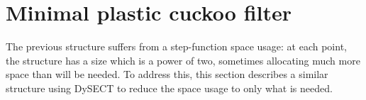 \documentclass[letterpaper, 11pt]{article}
\newcommand{\ints}{\mathbb{Z}}
\begin{document}









\section{Minimal plastic cuckoo filter}
\label{mpcf}

The previous structure suffers from a step-function space usage:
at each point, the structure has a size which is a power of two, sometimes allocating much more space than will be needed.
To address this, this section describes a similar structure using DySECT to reduce the space usage to only what is needed.~\cite{dysect}
\end{document}
